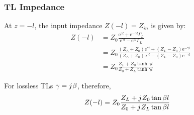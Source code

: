 \documentclass[10pt, compress]{beamer}
\newcommand{\e}{\mathrm{e}} %
\renewcommand{\j}{{j}\mkern1mu} %
\begin{document}
\begin{frame}
  \frametitle{TL Impedance}
At $z = -l$, the input impedance $Z(-l) = Z_{in}$ is given by:
\begin{align*}
  Z(-l) &= Z_0 \frac{\e^{\gamma l} + \e^{-\gamma l}\Gamma_L}{\e^{\gamma l} - \e^{\gamma l}\Gamma_L} \\
  &= Z_0 \frac{\left(Z_L + Z_0\right)\e^{\gamma l} + \left(Z_L - Z_0\right) \e^{-\gamma l}}{\left(Z_L + Z_0\right)\e^{\gamma l} - \left(Z_L - Z_0\right) \e^{-\gamma l}} \\
  &= Z_0 \frac{Z_L + Z_0 \tanh{\gamma l}}{Z_0 + Z_L \tanh{\gamma l}}
\end{align*}

For lossless TLs $\gamma = \j \beta$, therefore,
\begin{align*}
Z(-l) &= Z_0 \frac{Z_L + \j Z_0 \tan{\beta l}}{Z_0 + \j Z_L \tan{\beta l}}  
\end{align*}
\end{frame}
\end{document}
